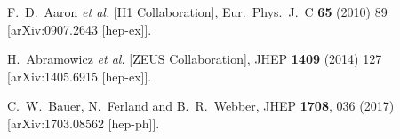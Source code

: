\documentclass[letter,11pt]{article}
\begin{document}
\begin{thebibliography}{99}
 F.~D.~Aaron {\it et al.} [H1 Collaboration],
 Eur.\ Phys.\ J.\ C {\bf 65} (2010) 89
 [arXiv:0907.2643 [hep-ex]].

 H.~Abramowicz {\it et al.} [ZEUS Collaboration],
 JHEP {\bf 1409} (2014) 127
 [arXiv:1405.6915 [hep-ex]].

  C.~W.~Bauer, N.~Ferland and B.~R.~Webber,
  JHEP {\bf 1708}, 036 (2017)
  [arXiv:1703.08562 [hep-ph]].

\end{thebibliography}
\end{document}
